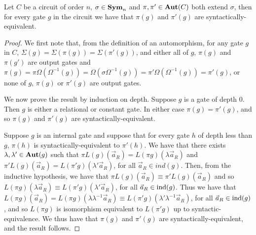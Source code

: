 \documentclass[../paper.tex]{subfiles}
\begin{document}
\begin{lem}
  Let $C$ be a circuit of order $n$, $\sigma \in \text{\textbf{Sym}}_n$ and $\pi, \pi' \in
  \text{\textbf{Aut}}(C)$ both extend $\sigma$, then for every gate $g$ in the circuit we have
  that $\pi (g)$ and $\pi'(g)$ are syntactically-equivalent.
  \label{lem:permutation-extending-syntactic-equivalence}
\end{lem}
\begin{proof}
  We first note that, from the definition of an automorphism, for any gate $g$
  in $C$, $\Sigma (g) = \Sigma (\pi (g)) = \Sigma (\pi' (g))$, and either all of
  $g$, $\pi (g)$ and $\pi (g')$ are output gates and $\pi (g) = \pi \Omega
  (\Omega^{-1}(g)) = \Omega (\sigma \Omega^{-1}(g)) = \pi' \Omega
  (\Omega^{-1}(g)) = \pi'(g)$, or none of $g$, $\pi(g)$ or $\pi' (g)$ are output
  gates.
  
  We now prove the result by induction on depth. Suppose $g$ is a gate of depth
  $0$. Then $g$ is either a relational or constant gate. In either case $\pi (g)
  = \pi' (g)$, and so $\pi(g)$ and $\pi'(g)$ are syntactically-equivalent.

  Suppose $g$ is an internal gate and suppose that for every gate $h$ of depth
  less than $g$, $\pi (h)$ is syntactically-equivalent to $\pi'(h)$. We have
  that there exists $\lambda, \lambda' \in \text{\textbf{Aut}}(g)$ such that $\pi
  L(g)(\vec{a}_R) = L(\pi g) (\lambda \vec{a}_R)$ and $\pi' L(g)(\vec{a}_R) =
  L(\pi' g)(\lambda' \vec{a}_R)$, for all $\vec{a}_R \in ind(g)$. Then, from the
  inductive hypothesis, we have that $\pi L(g)(\vec{a}_R) \equiv \pi
  'L(g)(\vec{a}_R)$ and so $L(\pi g)(\lambda \vec{a}_R) \equiv L(\pi' g)
  (\lambda' \vec{a}_R)$, for all $\vec{a}_R \in \text{\upshape ind}(g)$. Thus we have that
  $L(\pi g) (\vec{a}_R) = L (\pi g) (\lambda \lambda^{-1}\vec{a}_R) \equiv
  L(\pi' g) (\lambda' \lambda^{-1}\vec{a}_R)$, for all $\vec{a}_R \in \text{\upshape ind}(g)$,
  and so $L(\pi g)$ is isomorphism equivalent to $L(\pi'g)$ up to
  syntactic-equivalence. We thus have that $\pi (g) $ and $\pi' (g)$ are
  syntactically-equivalent, and the result follows.

  
\end{proof}
\end{document}
